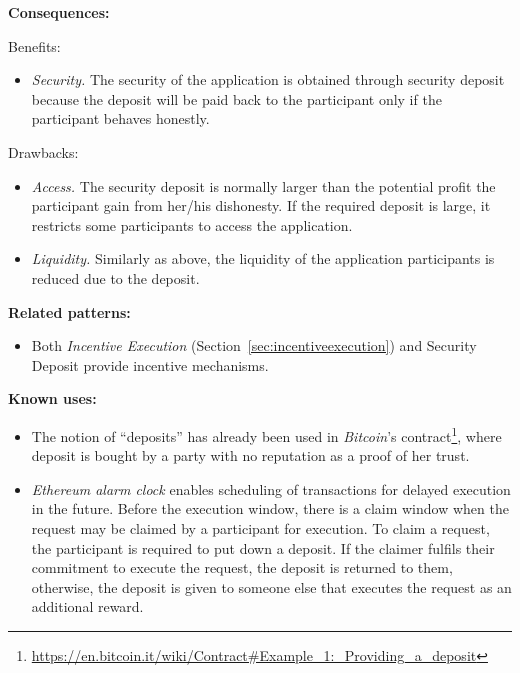 \vspace{0.5em}\noindent \textbf{Consequences:} 

Benefits:
\begin{itemize}
  \item \textit{Security.} The security of the application is obtained through security deposit because the deposit will be paid back to the participant only if the participant behaves honestly. 
\end{itemize}

Drawbacks: 
\begin{itemize}
    \item \textit{Access.} The security deposit is normally larger than the potential profit the participant gain from her/his dishonesty. If the required deposit is large, it restricts some participants to access the application. 
    \item \textit{Liquidity.} Similarly as above, the liquidity of the application participants is reduced due to the deposit.
\end{itemize}

\vspace{0.5em}\noindent \textbf{Related patterns:} 
\begin{itemize}
    \item Both \textit{Incentive Execution} (Section~\ref{sec:incentiveexecution}) and Security Deposit provide incentive mechanisms.
\end{itemize}


\vspace{0.5em}\noindent \textbf{Known uses:}
\begin{itemize}
  \item The notion of ``deposits'' has already been used in \textit{Bitcoin}'s contract\footnote{\url{https://en.bitcoin.it/wiki/Contract\#Example_1:_Providing_a_deposit}}, where deposit is bought by a party with no reputation as a proof of her trust. 
  \item \textit{Ethereum alarm clock} enables scheduling of transactions for delayed execution in the future. Before the execution window, there is a claim window when the request may be claimed by a participant for execution. To claim a request, the participant is required to put down a deposit. If the claimer fulfils their commitment to execute the request, the deposit is returned to them, otherwise, the deposit is given to someone else that executes the request as an additional reward. 
 \end{itemize}



